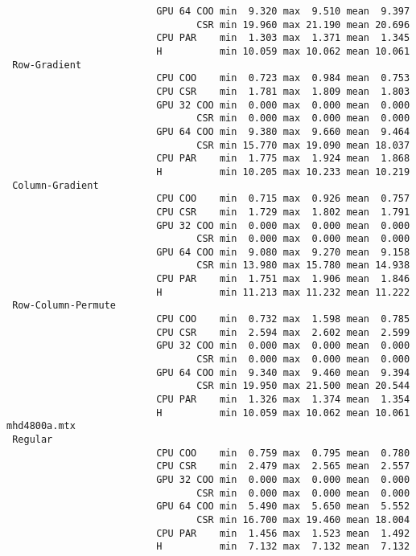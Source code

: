 \begin{verbatim}
                          GPU 64 COO min  9.320 max  9.510 mean  9.397
                                 CSR min 19.960 max 21.190 mean 20.696
                          CPU PAR    min  1.303 max  1.371 mean  1.345
                          H          min 10.059 max 10.062 mean 10.061
 Row-Gradient
                          CPU COO    min  0.723 max  0.984 mean  0.753
                          CPU CSR    min  1.781 max  1.809 mean  1.803
                          GPU 32 COO min  0.000 max  0.000 mean  0.000
                                 CSR min  0.000 max  0.000 mean  0.000
                          GPU 64 COO min  9.380 max  9.660 mean  9.464
                                 CSR min 15.770 max 19.090 mean 18.037
                          CPU PAR    min  1.775 max  1.924 mean  1.868
                          H          min 10.205 max 10.233 mean 10.219
 Column-Gradient
                          CPU COO    min  0.715 max  0.926 mean  0.757
                          CPU CSR    min  1.729 max  1.802 mean  1.791
                          GPU 32 COO min  0.000 max  0.000 mean  0.000
                                 CSR min  0.000 max  0.000 mean  0.000
                          GPU 64 COO min  9.080 max  9.270 mean  9.158
                                 CSR min 13.980 max 15.780 mean 14.938
                          CPU PAR    min  1.751 max  1.906 mean  1.846
                          H          min 11.213 max 11.232 mean 11.222
 Row-Column-Permute
                          CPU COO    min  0.732 max  1.598 mean  0.785
                          CPU CSR    min  2.594 max  2.602 mean  2.599
                          GPU 32 COO min  0.000 max  0.000 mean  0.000
                                 CSR min  0.000 max  0.000 mean  0.000
                          GPU 64 COO min  9.340 max  9.460 mean  9.394
                                 CSR min 19.950 max 21.500 mean 20.544
                          CPU PAR    min  1.326 max  1.374 mean  1.354
                          H          min 10.059 max 10.062 mean 10.061
mhd4800a.mtx
 Regular
                          CPU COO    min  0.759 max  0.795 mean  0.780
                          CPU CSR    min  2.479 max  2.565 mean  2.557
                          GPU 32 COO min  0.000 max  0.000 mean  0.000
                                 CSR min  0.000 max  0.000 mean  0.000
                          GPU 64 COO min  5.490 max  5.650 mean  5.552
                                 CSR min 16.700 max 19.460 mean 18.004
                          CPU PAR    min  1.456 max  1.523 mean  1.492
                          H          min  7.132 max  7.132 mean  7.132

\end{verbatim}
